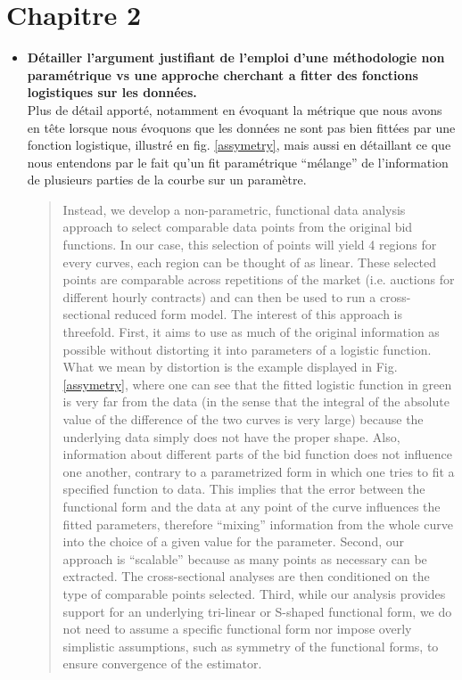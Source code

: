 \documentclass{article}
\begin{document}
\section{Chapitre 2}
\begin{itemize}
\item \textbf{Détailler l'argument justifiant de l'emploi d'une méthodologie non paramétrique vs une approche cherchant a fitter des fonctions logistiques sur les données.}\\

Plus de détail apporté, notamment en évoquant la métrique que nous avons en tête lorsque nous évoquons que les données ne sont pas bien fittées par une fonction logistique, illustré en fig. \ref{assymetry}, mais aussi en détaillant ce que nous entendons par le fait qu'un fit paramétrique ``mélange'' de l'information de plusieurs parties de la courbe sur un paramètre.

\begin{quote}
Instead, we develop a non-parametric, functional data analysis approach to select comparable data points from the original bid functions. In our case, this selection of points will yield 4 regions for every curves, each region can be thought of as linear. These selected points are comparable across repetitions of the market (i.e. auctions for different hourly contracts) and can then be used to run a cross-sectional reduced form model. The interest of this approach is threefold. First, it aims to use as much of the original information as possible without distorting it into parameters of a logistic function. What we mean by distortion is the example displayed in Fig. \ref{assymetry}, where one can see that the fitted logistic function in green is very far from the data (in the sense that the integral of the absolute value of the difference of the two curves is very large) because the underlying data simply does not have the proper shape. Also, information about different parts of the bid function does not influence one another, contrary to a parametrized form in which one tries to fit a specified function to data. This implies that the error between the functional form and the data at any point of the curve influences the fitted parameters, therefore ``mixing'' information from the whole curve into the choice of a given value for the parameter. Second, our approach is “scalable” because as many points as necessary can be extracted. The cross-sectional analyses are then conditioned on the type of comparable points selected. Third, while our analysis provides support for an underlying tri-linear or S-shaped functional form, we do not need to assume a specific functional form nor impose overly simplistic assumptions, such as symmetry of the functional forms, to ensure convergence of the estimator.\\
\end{quote}


\end{itemize}
\end{document}
